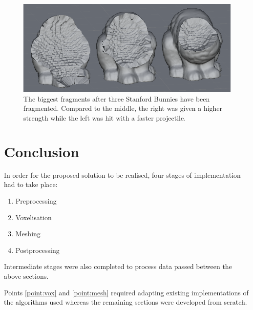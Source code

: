 \begin{figure}
\centerline{\includegraphics[scale=0.85]{voxel_forces.png}}
\caption{The biggest fragments after three Stanford Bunnies have been fragmented. Compared to the middle, the right was given a higher strength while the left was hit with a faster projectile.}
\label{fig:3.16}
\end{figure}

\section{Conclusion}

In order for the proposed solution to be realised, four stages of implementation had to take place:

\begin{enumerate}
\item{Preprocessing}
\label{point:pre}
\item{Voxelisation}
\label{point:vox}
\item{Meshing}
\label{point:mesh}
\item{Postprocessing}
\label{point:post}
\end{enumerate}

Intermediate stages were also completed to process data passed between the above sections.

Points \ref{point:vox} and \ref{point:mesh} required adapting existing implementations of the algorithms used whereas the remaining sections were developed from scratch.